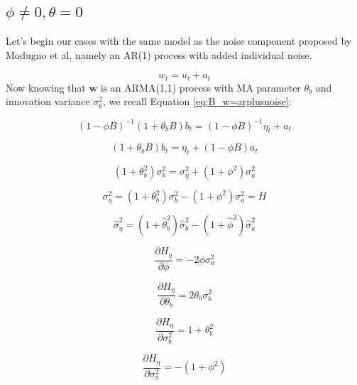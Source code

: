\subsection{$\phi \neq 0, \theta = 0$}
Let's begin our cases with the same model as the noise component proposed by Modugno et al, namely an AR(1) process with added individual noise.


$$ w_t = u_t + a_t $$
Now knowing that $\mathbf{w}$ is an ARMA(1,1) process with MA parameter $\theta_b$ and innovation variance $\sigma_b^2$, we recall Equation \ref{eq:B_w=arplusnoise}:

$$ (1 - \phi B)^{-1}(1 + \theta_bB)b_t = (1 - \phi B)^{-1} \eta_t + a_t $$

$$ (1 + \theta_bB)b_t = \eta_t + (1 - \phi B)a_t $$

$$ (1 + \theta_b^2)\sigma_b^2 = \sigma_\eta^2 + (1 + \phi^2)\sigma_a^2 $$

$$ {\sigma}_\eta^2 = (1 + {\theta}_b^2){\sigma}_b^2 - (1 + {\phi}^2){\sigma}_a^2 = H $$

$$ \hat{\sigma}_\eta^2 = (1 + \hat{\theta}_b^2)\hat{\sigma}_b^2 - (1 + \hat{\phi}^2)\hat{\sigma}_a^2 $$

$$ \frac{\partial H_\eta}{\partial \phi} = -2\phi\sigma_a^2$$

$$ \frac{\partial H_\eta}{\partial \theta_b} = 2\theta_b\sigma_b^2$$

$$ \frac{\partial H_\eta}{\partial \sigma_b^2} = 1 + \theta_b^2$$

$$ \frac{\partial H_\eta}{\partial \sigma_a^2} = -(1 + \phi^2)$$


